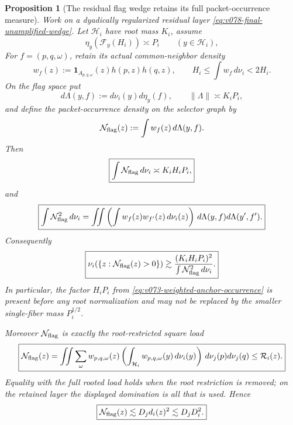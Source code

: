 \documentclass[10pt]{article}
\newtheorem{proposition}[theorem]{Proposition}
\begin{document}
\begin{proposition}[The residual flag wedge retains its full packet-occurrence measure]
\label{prop:v078-flag-packet-incidence-lift}
Work on a dyadically regularized residual layer
\eqref{eq:v078-final-unamplified-wedge}.  Let \(\mathcal H_i\) have root mass \(K_i\), assume
\[
\eta_y(\mathscr F_y(H_i))\asymp P_i
\qquad(y\in\mathcal H_i),
\]
For \(f=(p,q,\omega)\), retain its actual common-neighbor density
\[
w_f(z)
:=
\mathbf 1_{A_{p,q,\omega}}(z)h(p,z)h(q,z),
\qquad
H_i\le\int w_f\,d\nu_i<2H_i.
\]
On the flag space put
\[
d\Lambda(y,f)
:=
d\nu_i(y)d\eta_y(f),
\qquad
\|\Lambda\|\asymp K_iP_i,
\]
and define the packet-occurrence density on the selector graph by
\[
\mathcal N_{\rm flag}(z)
:=
\int w_f(z)\,d\Lambda(y,f).
\]
Then
\begin{equation}
\label{eq:v078-flag-lift-first-moment}
\boxed{
\int\mathcal N_{\rm flag}\,d\nu_i
\asymp
K_iH_iP_i,
}
\end{equation}
and
\begin{equation}
\label{eq:v078-flag-lift-second-moment}
\boxed{
\int\mathcal N_{\rm flag}^2\,d\nu_i
=
\iint
\left(\int w_f(z)w_{f'}(z)\,d\nu_i(z)\right)
\,d\Lambda(y,f)d\Lambda(y',f').
}
\end{equation}
Consequently
\begin{equation}
\label{eq:v078-flag-packet-union}
\boxed{
\nu_i\!\left(\{z:\mathcal N_{\rm flag}(z)>0\}\right)
\gtrsim
\frac{(K_iH_iP_i)^2}
{\int\mathcal N_{\rm flag}^2\,d\nu_i}.
}
\end{equation}
In particular, the factor \(H_iP_i\) from
\eqref{eq:v073-weighted-anchor-occurrence} is present before any root normalization and may not be
replaced by the smaller single-fiber mass \(P_i^{1/2}\).

Moreover \(\mathcal N_{\rm flag}\) is exactly the root-restricted square load
\begin{equation}
\label{eq:v078-flag-load-self-duality}
\boxed{
\mathcal N_{\rm flag}(z)
=
\iint\sum_\omega
w_{p,q,\omega}(z)
\left(\int_{\mathcal H_i}w_{p,q,\omega}(y)\,d\nu_i(y)\right)
\,d\nu_j(p)d\nu_j(q)
\le
\mathcal R_i(z).
}
\end{equation}
Equality with the full rooted load holds when the root restriction is removed; on the retained
layer the displayed domination is all that is used.  Hence
\begin{equation}
\label{eq:v078-flag-load-pointwise-cap}
\boxed{
\mathcal N_{\rm flag}(z)
\lesssim
D_jd_i(z)^2
\lesssim
D_jD_i^2.
}
\end{equation}
\end{proposition}
\end{document}
